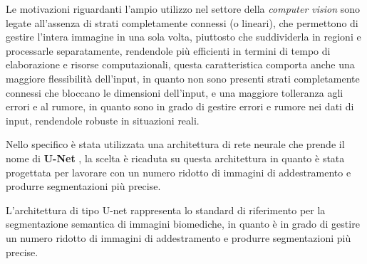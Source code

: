 Le motivazioni riguardanti l'ampio utilizzo nel settore della \textit{computer vision}
sono legate all'assenza di strati completamente connessi (o lineari), che permettono di gestire l'intera immagine in una sola volta, piuttosto che suddividerla in regioni e processarle separatamente, rendendole pi\`u efficienti in termini di tempo di elaborazione e risorse computazionali,
questa caratteristica comporta anche una maggiore flessibilit\`a dell'input, in quanto non sono presenti strati completamente connessi che bloccano le dimensioni dell'input, e una maggiore tolleranza agli errori e al rumore, in quanto sono in grado di gestire errori e rumore nei dati di input, rendendole robuste in situazioni reali.

Nello specifico \`e stata utilizzata una architettura di rete neurale che prende il nome di \textbf{U-Net} \cite{ronneberger2015unet},
la scelta \`e ricaduta su questa architettura in quanto \`e stata progettata per lavorare con un numero ridotto di immagini di addestramento e produrre segmentazioni pi\`u precise.

%
%

L'architettura di tipo U-net rappresenta lo standard di riferimento per la segmentazione semantica di immagini biomediche, in quanto \`e in grado di gestire un numero ridotto di immagini di addestramento e produrre segmentazioni pi\`u precise.


